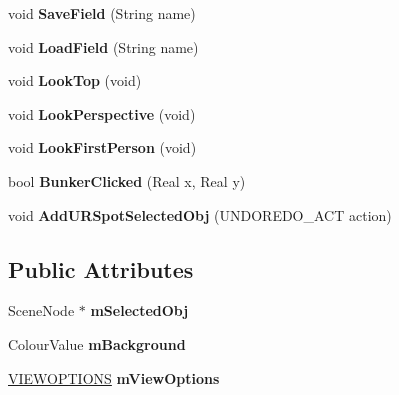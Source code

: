 \begin{DoxyCompactItemize}
\item 
\hypertarget{class_p_f_d_application_a22a65ae8e5e16f31986b0c776b1dcf78}{
void {\bfseries SaveField} (String name)}
\label{class_p_f_d_application_a22a65ae8e5e16f31986b0c776b1dcf78}

\item 
\hypertarget{class_p_f_d_application_af521ab3545c00110cf50bef407cc3fee}{
void {\bfseries LoadField} (String name)}
\label{class_p_f_d_application_af521ab3545c00110cf50bef407cc3fee}

\item 
\hypertarget{class_p_f_d_application_a1c06b8f0a2d4ccc259c54a551d9c54a3}{
void {\bfseries LookTop} (void)}
\label{class_p_f_d_application_a1c06b8f0a2d4ccc259c54a551d9c54a3}

\item 
\hypertarget{class_p_f_d_application_a5226e76e18cd33f703acf45598a980b2}{
void {\bfseries LookPerspective} (void)}
\label{class_p_f_d_application_a5226e76e18cd33f703acf45598a980b2}

\item 
\hypertarget{class_p_f_d_application_a163f01f1c1cb37df843922bc5d7a2f1b}{
void {\bfseries LookFirstPerson} (void)}
\label{class_p_f_d_application_a163f01f1c1cb37df843922bc5d7a2f1b}

\item 
\hypertarget{class_p_f_d_application_a50a6c2671e6cd13073f51c10e7a365f3}{
bool {\bfseries BunkerClicked} (Real x, Real y)}
\label{class_p_f_d_application_a50a6c2671e6cd13073f51c10e7a365f3}

\item 
\hypertarget{class_p_f_d_application_ad6fa92bce0338fdda1360021b8f938ca}{
void {\bfseries AddURSpotSelectedObj} (UNDOREDO\_\-ACT action)}
\label{class_p_f_d_application_ad6fa92bce0338fdda1360021b8f938ca}

\end{DoxyCompactItemize}
\subsection*{Public Attributes}
\begin{DoxyCompactItemize}
\item 
\hypertarget{class_p_f_d_application_a9c129ad19f09f0c7d3fc8104d7755d09}{
SceneNode $\ast$ {\bfseries mSelectedObj}}
\label{class_p_f_d_application_a9c129ad19f09f0c7d3fc8104d7755d09}

\item 
\hypertarget{class_p_f_d_application_a3336fca010a1e28b6a0afe9f38ac762c}{
ColourValue {\bfseries mBackground}}
\label{class_p_f_d_application_a3336fca010a1e28b6a0afe9f38ac762c}

\item 
\hypertarget{class_p_f_d_application_abd7554a11753f3d942f35b3f2a17854f}{
\hyperlink{struct_v_i_e_w_o_p_t_i_o_n_s}{VIEWOPTIONS} {\bfseries mViewOptions}}
\label{class_p_f_d_application_abd7554a11753f3d942f35b3f2a17854f}

\end{DoxyCompactItemize}
